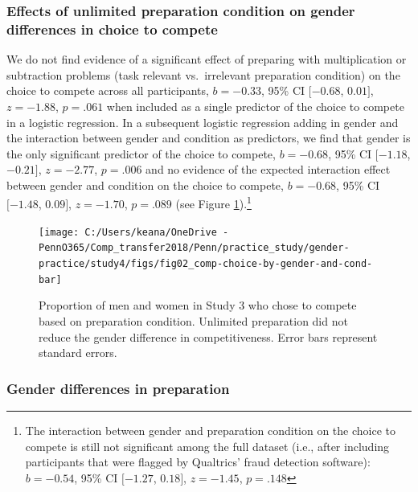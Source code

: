 \documentclass[a4paper, nobind]{templates/ociamthesis}
\begin{document}
\hypertarget{effects-of-unlimited-preparation-condition-on-gender-differences-in-choice-to-compete}{%
\subsubsection{Effects of unlimited preparation condition on gender differences in choice to compete}\label{effects-of-unlimited-preparation-condition-on-gender-differences-in-choice-to-compete}}

We do not find evidence of a significant effect of preparing with multiplication or subtraction problems (task relevant vs.~irrelevant preparation condition) on the choice to compete across all participants, \(b = -0.33\), 95\% CI \([-0.68\), \(0.01]\), \(z = -1.88\), \(p = .061\) when included as a single predictor of the choice to compete in a logistic regression. In a subsequent logistic regression adding in gender and the interaction between gender and condition as predictors, we find that gender is the only significant predictor of the choice to compete, \(b = -0.68\), 95\% CI \([-1.18\), \(-0.21]\), \(z = -2.77\), \(p = .006\) and no evidence of the expected interaction effect between gender and condition on the choice to compete, \(b = -0.68\), 95\% CI \([-1.48\), \(0.09]\), \(z = -1.70\), \(p = .089\) (see Figure \ref{fig:s300}).\footnote{The interaction between gender and preparation condition on the choice to compete is still not significant among the full dataset (i.e., after including participants that were flagged by Qualtrics' fraud detection software): \(b = -0.54\), 95\% CI \([-1.27\), \(0.18]\), \(z = -1.45\), \(p = .148\)}

\begin{figure}

{\centering \texttt{[image: C:/Users/keana/OneDrive - PennO365/Comp\_transfer2018/Penn/practice\_study/gender-practice/study4/figs/fig02\_comp-choice-by-gender-and-cond-bar]} 

}

\caption{Proportion of men and women in Study 3 who chose to compete based on preparation condition. Unlimited preparation did not reduce the gender difference in competitiveness. Error bars represent standard errors.}\label{fig:s300}
\end{figure}

\hypertarget{gender-differences-in-preparation-3}{%
\subsubsection{Gender differences in preparation}\label{gender-differences-in-preparation-3}}
\end{document}
